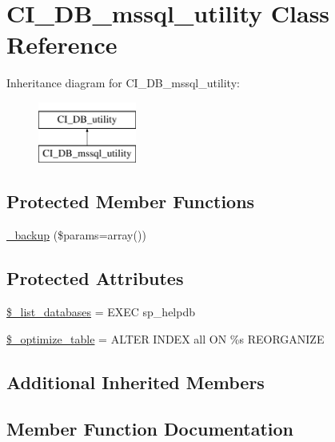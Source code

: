 \hypertarget{class_c_i___d_b__mssql__utility}{}\section{C\+I\+\_\+\+D\+B\+\_\+mssql\+\_\+utility Class Reference}
\label{class_c_i___d_b__mssql__utility}
Inheritance diagram for C\+I\+\_\+\+D\+B\+\_\+mssql\+\_\+utility\+:\begin{figure}[H]
\begin{center}
\leavevmode
\includegraphics[height=2.000000cm]{class_c_i___d_b__mssql__utility}
\end{center}
\end{figure}
\subsection*{Protected Member Functions}
\begin{DoxyCompactItemize}
\item 
\hyperlink{class_c_i___d_b__mssql__utility_a30f3053d2c82e7562349924363507afa}{\+\_\+backup} (\$params=array())
\end{DoxyCompactItemize}
\subsection*{Protected Attributes}
\begin{DoxyCompactItemize}
\item 
\hyperlink{class_c_i___d_b__mssql__utility_afe3a5b80562d93d6bc7e2b53c95b7e5a}{\$\+\_\+list\+\_\+databases} = \textquotesingle{}E\+X\+E\+C sp\+\_\+helpdb\textquotesingle{}
\item 
\hyperlink{class_c_i___d_b__mssql__utility_a083199e5c22c78912dae0a47bb2d7fad}{\$\+\_\+optimize\+\_\+table} = \textquotesingle{}A\+L\+T\+E\+R I\+N\+D\+E\+X all O\+N \%s R\+E\+O\+R\+G\+A\+N\+I\+Z\+E\textquotesingle{}
\end{DoxyCompactItemize}
\subsection*{Additional Inherited Members}


\subsection{Member Function Documentation}
\hypertarget{class_c_i___d_b__mssql__utility_a30f3053d2c82e7562349924363507afa}{}

